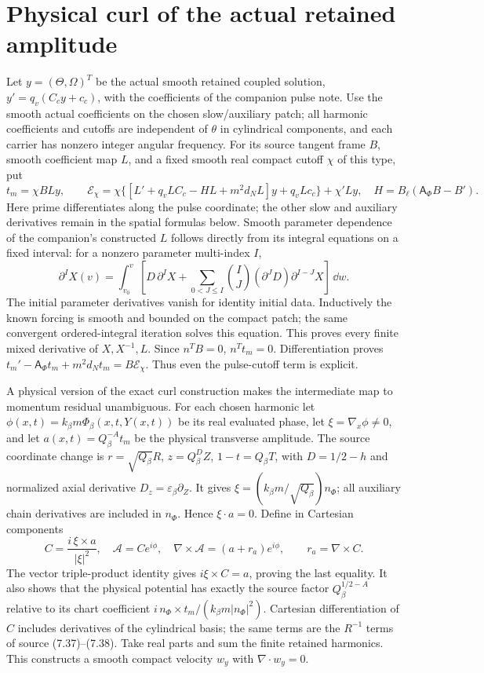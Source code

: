 \section{Physical curl of the actual retained amplitude}
Let $y=(\Theta,\Omega)^T$ be the actual smooth retained coupled solution,
$y'=q_v(C_cy+c_c)$, with the coefficients of the companion pulse note.
Use the smooth actual coefficients on the chosen slow/auxiliary patch;
all harmonic coefficients and cutoffs are independent of $\theta$ in
cylindrical components, and each carrier has nonzero integer angular
frequency. For its source tangent frame $B$, smooth coefficient map $L$,
and a fixed smooth real compact cutoff $\chi$ of this type, put
\[
 t_m=\chi BLy,\qquad
 \mathcal E_\chi=
 \chi\{[L'+q_vLC_c-HL+m^2d_NL]y+q_vLc_c\}+\chi'Ly,
 \quad H=B_\ell(\mathsf A_\Phi B-B').
\]
Here prime differentiates along the pulse coordinate; the other slow
and auxiliary derivatives remain in the spatial formulas below.
Smooth parameter dependence of the companion's constructed $L$ follows
directly from its integral equations on a fixed interval: for a nonzero
parameter multi-index $I$,
\[
 \partial^I X(v)=
 \int_{v_0}^v\left[D\,\partial^I X+
 \sum_{0<J\le I}\binom{I}{J}(\partial^JD)
                                 \partial^{I-J}X\right]\,\dd w .
\]
The initial parameter derivatives vanish for identity initial data.
Inductively the known forcing is smooth and bounded on the compact patch;
the same convergent ordered-integral iteration solves this equation.
This proves every finite mixed derivative of $X,X^{-1},L$.
Since $n^TB=0$, $n^Tt_m=0$. Differentiation proves
$t_m'-\mathsf A_\Phi t_m+m^2d_Nt_m=B\mathcal E_\chi$.
Thus even the pulse-cutoff term is explicit.

A physical version of the exact curl construction makes the intermediate
map to momentum residual unambiguous. For each chosen harmonic let
$\phi(x,t)=k_\beta m\Phi_\beta(x,t,Y(x,t))$ be its real evaluated phase,
let $\xi=\nabla_x\phi\ne0$, and let $a(x,t)=Q_\beta^{-A}t_m$ be the
physical transverse amplitude. The source coordinate change is
$r=\sqrt{Q_\beta}R$, $z=Q_\beta^D Z$, $1-t=Q_\beta T$,
with $D=1/2-h$ and normalized axial derivative
$D_z=\varepsilon_\beta\partial_Z$. It gives
$\xi=(k_\beta m/\sqrt{Q_\beta})n_\Phi$; all auxiliary chain derivatives
are included in $n_\Phi$. Hence $\xi\cdot a=0$. Define in Cartesian
components
\begin{equation}
 C=\frac{i\,\xi\times a}{|\xi|^2},\quad
 \mathcal A=C e^{i\phi},\quad
 \nabla\times\mathcal A=(a+r_a)e^{i\phi},\qquad
 r_a=\nabla\times C. \label{nsbridge:cb:curl}
\end{equation}
The vector triple-product identity gives
$i\xi\times C=a$, proving the last equality. It also shows that the
physical potential has exactly the source factor $Q_\beta^{1/2-A}$
relative to its chart coefficient
$i\,n_\Phi\times t_m/(k_\beta m|n_\Phi|^2)$.
Cartesian differentiation of $C$ includes derivatives of the cylindrical
basis; the same terms are the $R^{-1}$ terms of source (7.37)--(7.38).
Take real parts and sum the finite retained harmonics. This constructs
a smooth compact velocity $w_y$ with $\nabla\cdot w_y=0$.

